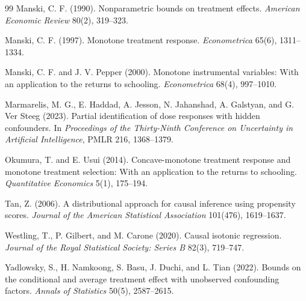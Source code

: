 \documentclass[11pt]{article}
\theoremstyle{definition}
\theoremstyle{plain}
\theoremstyle{remark}
\begin{document}
\begin{thebibliography}{99}
Manski, C. F. (1990).
\newblock Nonparametric bounds on treatment effects.
\newblock \emph{American Economic Review} 80(2), 319--323.

Manski, C. F. (1997).
\newblock Monotone treatment response.
\newblock \emph{Econometrica} 65(6), 1311--1334.

Manski, C. F. and J. V. Pepper (2000).
\newblock Monotone instrumental variables: With an application to the returns to schooling.
\newblock \emph{Econometrica} 68(4), 997--1010.

Marmarelis, M. G., E. Haddad, A. Jesson, N. Jahanshad, A. Galstyan, and G. Ver Steeg (2023).
\newblock Partial identification of dose responses with hidden confounders.
\newblock In \emph{Proceedings of the Thirty-Ninth Conference on Uncertainty in Artificial Intelligence}, PMLR 216, 1368--1379.

Okumura, T. and E. Usui (2014).
\newblock Concave-monotone treatment response and monotone treatment selection: With an application to the returns to schooling.
\newblock \emph{Quantitative Economics} 5(1), 175--194.

Tan, Z. (2006).
\newblock A distributional approach for causal inference using propensity scores.
\newblock \emph{Journal of the American Statistical Association} 101(476), 1619--1637.

Westling, T., P. Gilbert, and M. Carone (2020).
\newblock Causal isotonic regression.
\newblock \emph{Journal of the Royal Statistical Society: Series B} 82(3), 719--747.

Yadlowsky, S., H. Namkoong, S. Basu, J. Duchi, and L. Tian (2022).
\newblock Bounds on the conditional and average treatment effect with unobserved confounding factors.
\newblock \emph{Annals of Statistics} 50(5), 2587--2615.
\end{thebibliography}
\end{document}
